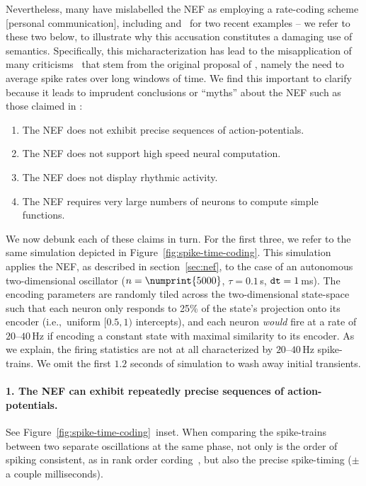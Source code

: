 Nevertheless, many have mislabelled the NEF as employing a rate-coding scheme [personal communication], including \citet{lagorce2015stick} and~\citet{frady2019robust} for two recent examples -- we refer to these two below, to illustrate why this accusation constitutes a damaging use of semantics.
Specifically, this micharacterization has lead to the misapplication of many criticisms~\citep{gautrais1998rate} that stem from the original proposal of \citet{adrian1928basis}, namely the need to average spike rates over long windows of time.
We find this important to clarify because it leads to imprudent conclusions or ``myths'' about the NEF such as those claimed in \citet{lagorce2015stick, frady2019robust}:
\begin{enumerate}
\item The NEF does not exhibit precise sequences of action-potentials.
\item The NEF does not support high speed neural computation.
\item The NEF does not display rhythmic activity.
\item The NEF requires very large numbers of neurons to compute simple functions.
\end{enumerate}
We now debunk each of these claims in turn.
For the first three, we refer to the same simulation depicted in Figure~\ref{fig:spike-time-coding}.
This simulation applies the NEF, as described in section~\ref{sec:nef}, to the case of an autonomous two-dimensional oscillator ($n = \numprint{5000}$, $\tau = 0.1$\,s, $\texttt{dt}{} = 1$\,ms).
The encoding parameters are randomly tiled across the two-dimensional state-space such that each neuron only responds to 25\% of the state's projection onto its encoder (i.e.,~uniform $[0.5, 1)$ intercepts), and each neuron \emph{would} fire at a rate of $20$--$40$\,Hz if encoding a constant state with maximal similarity to its encoder.
As we explain, the firing statistics are not at all characterized by $20$--$40$\,Hz spike-trains.
We omit the first $1.2$ seconds of simulation to wash away initial transients.

\paragraph{1. The NEF can exhibit repeatedly precise sequences of action-potentials.}

See Figure~\ref{fig:spike-time-coding}~inset.
When comparing the spike-trains between two separate oscillations at the same phase, not only is the order of spiking consistent, as in rank order cording~\citep{thorpe1998rank}, but also the precise spike-timing ($\pm$ a couple milliseconds).

